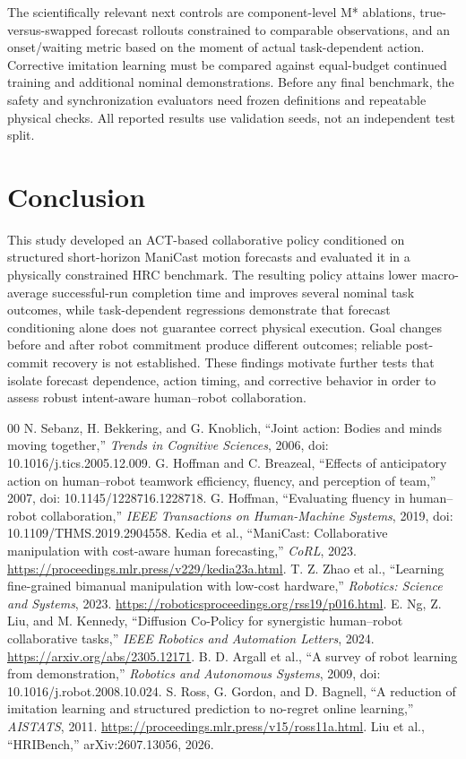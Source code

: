 \documentclass[conference]{IEEEtran}
\begin{document}
The scientifically relevant next controls are component-level M* ablations, true-versus-swapped forecast rollouts constrained to comparable observations, and an onset/waiting metric based on the moment of actual task-dependent action. Corrective imitation learning must be compared against equal-budget continued training and additional nominal demonstrations. Before any final benchmark, the safety and synchronization evaluators need frozen definitions and repeatable physical checks. All reported results use validation seeds, not an independent test split.

\section{Conclusion}
This study developed an ACT-based collaborative policy conditioned on structured short-horizon ManiCast motion forecasts and evaluated it in a physically constrained HRC benchmark. The resulting policy attains lower macro-average successful-run completion time and improves several nominal task outcomes, while task-dependent regressions demonstrate that forecast conditioning alone does not guarantee correct physical execution. Goal changes before and after robot commitment produce different outcomes; reliable post-commit recovery is not established. These findings motivate further tests that isolate forecast dependence, action timing, and corrective behavior in order to assess robust intent-aware human--robot collaboration.

\begin{thebibliography}{00}
 N. Sebanz, H. Bekkering, and G. Knoblich, ``Joint action: Bodies and minds moving together,'' \emph{Trends in Cognitive Sciences}, 2006, doi: 10.1016/j.tics.2005.12.009.
 G. Hoffman and C. Breazeal, ``Effects of anticipatory action on human--robot teamwork efficiency, fluency, and perception of team,'' 2007, doi: 10.1145/1228716.1228718.
 G. Hoffman, ``Evaluating fluency in human--robot collaboration,'' \emph{IEEE Transactions on Human-Machine Systems}, 2019, doi: 10.1109/THMS.2019.2904558.
 Kedia et al., ``ManiCast: Collaborative manipulation with cost-aware human forecasting,'' \emph{CoRL}, 2023. \url{https://proceedings.mlr.press/v229/kedia23a.html}.
 T. Z. Zhao et al., ``Learning fine-grained bimanual manipulation with low-cost hardware,'' \emph{Robotics: Science and Systems}, 2023. \url{https://roboticsproceedings.org/rss19/p016.html}.
 E. Ng, Z. Liu, and M. Kennedy, ``Diffusion Co-Policy for synergistic human--robot collaborative tasks,'' \emph{IEEE Robotics and Automation Letters}, 2024. \url{https://arxiv.org/abs/2305.12171}.
 B. D. Argall et al., ``A survey of robot learning from demonstration,'' \emph{Robotics and Autonomous Systems}, 2009, doi: 10.1016/j.robot.2008.10.024.
 S. Ross, G. Gordon, and D. Bagnell, ``A reduction of imitation learning and structured prediction to no-regret online learning,'' \emph{AISTATS}, 2011. \url{https://proceedings.mlr.press/v15/ross11a.html}.
 Liu et al., ``HRIBench,'' arXiv:2607.13056, 2026.
\end{thebibliography}
\end{document}
